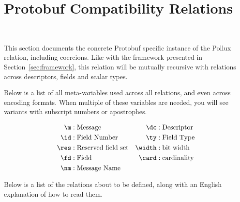 \section{Protobuf Compatibility Relations}~\label{sec:proto-relations}

This section documents the concrete Protobuf specific instance of the Pollux
relation, including coercions. Like with the framework presented in
Section~\ref{sec:framework}, this relation will be mutually recursive with
relations across descriptors, fields and scalar types.

Below is a list of all meta-variables used across all relations, and even across
encoding formats. When multiple of these variables are needed, you will see
variants with subscript numbers or apostrophes.

\begin{align*}
  \m &: \text{Message} & \dc &: \text{Descriptor} \\
  \id &: \text{Field Number} & \ty &: \text{Field Type} \\
  \res &: \text{Reserved field set} & \width &: \text{bit width} \\
  \fd &: \text{Field} & \card &: \text{cardinality} \\
  \nm &: \text{Message Name}
\end{align*}

Below is a list of the relations about to be defined, along with an English
explanation of how to read them.

